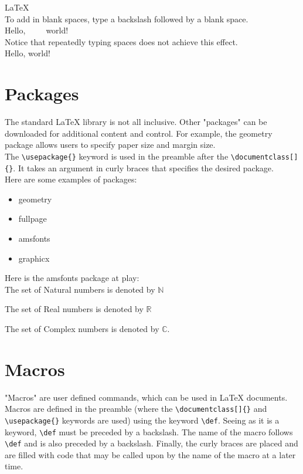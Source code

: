 \documentclass[11pt]{article}
\begin{document}
\LaTeX \\

To add in blank spaces, type a backslash followed by a blank space.
\\
Hello,\ \ \ \ \ world! \\

Notice that repeatedly typing spaces does not achieve this effect.
\\
Hello,          world! \\

\section{Packages}

The standard LaTeX library is not all inclusive. Other "packages" can be downloaded for additional content and control. For example, the geometry package allows users to specify paper size and margin size.\\ 
The \texttt{\textbackslash usepackage\{\}} keyword is used in the preamble after the \texttt{\textbackslash documentclass[]\{\}}. It takes an argument in curly braces that specifies the desired package. \\
Here are some examples of packages:

\begin{itemize}
	\item geometry
	\item fullpage
	\item amsfonts
	\item graphicx
\end{itemize}

Here is the amsfonts package at play: \\

The set of Natural numbers is denoted by $\mathbb{N}$

The set of Real numbers is denoted by $\mathbb{R}$

The set of Complex numbers is denoted by $\mathbb{C}$.

\section{Macros}

"Macros" are user defined commands, which can be used in LaTeX documents. Macros are defined in the preamble (where the \texttt{\textbackslash documentclass[]\{\}} and \texttt{\textbackslash usepackage\{\}} keywords are used) using the keyword \texttt{\textbackslash def}. Seeing as it is a keyword, \texttt{\textbackslash def} must be preceded by a backslash. The name of the macro follows \texttt{\textbackslash def} and is also preceded by a backslash. Finally, the curly braces are placed and are filled with code that may be called upon by the name of the macro at a later time. \\
\end{document}
